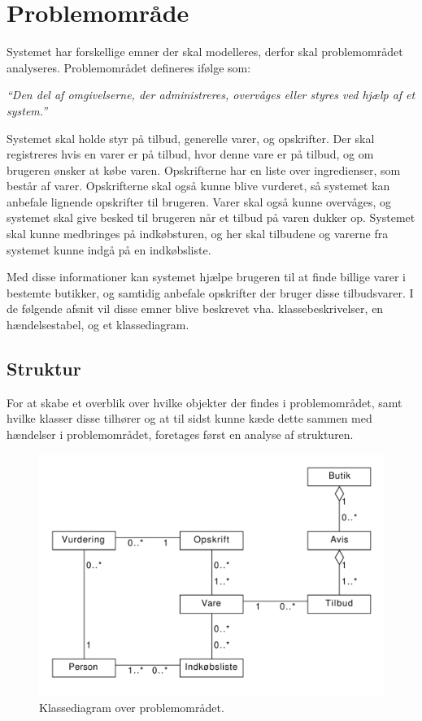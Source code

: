\chapter{Problemområde}

Systemet har forskellige emner der skal modelleres, derfor skal problemområdet analyseres.
Problemområdet defineres ifølge \citep{OOA&D2001} som:

\textit{``Den del af omgivelserne, der administreres, overvåges eller styres ved hjælp af et system.''}

Systemet skal holde styr på tilbud, generelle varer, og opskrifter. 
Der skal registreres hvis en varer er på tilbud, hvor denne vare er på tilbud, og om brugeren ønsker at købe varen.
Opskrifterne har en liste over ingredienser, som består af varer. 
Opskrifterne skal også kunne blive vurderet, så systemet kan anbefale lignende opskrifter til brugeren.
Varer skal også kunne overvåges, og systemet skal give besked til brugeren når et tilbud på varen dukker op.
Systemet skal kunne medbringes på indkøbsturen, og her skal tilbudene og varerne fra systemet kunne indgå på en indkøbsliste.

Med disse informationer kan systemet hjælpe brugeren til at finde billige varer i bestemte butikker, og samtidig anbefale opskrifter der bruger disse tilbudsvarer.
I de følgende afsnit vil disse emner blive beskrevet vha. klassebeskrivelser, en hændelsestabel, og et klassediagram.

\section{Struktur}\label{sec:struktur}
For at skabe et overblik over hvilke objekter der findes i problemområdet, samt hvilke klasser disse tilhører og at til sidst kunne kæde dette sammen med hændelser i problemområdet, foretages først en analyse af strukturen.\\

\begin{figure}
	\centering
		\includegraphics[scale=0.6]{images/Diagrams/klassediagram_model_simple.pdf}
	\caption{Klassediagram over problemområdet.}
	\label{figur:PDklasse}
\end{figure}

